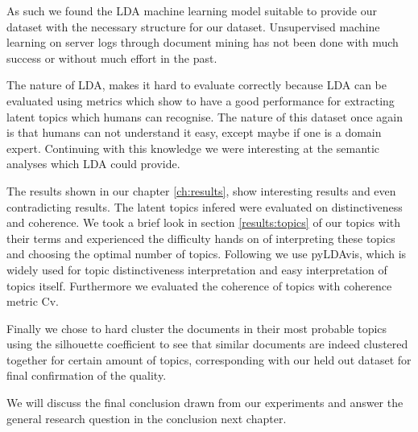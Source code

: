 As such we found the LDA machine learning model suitable to provide our dataset with the necessary structure for our dataset. Unsupervised machine learning on server logs through document mining has not been done with much success or without much effort in the past.

The nature of LDA, makes it hard to evaluate correctly because LDA can be evaluated using metrics which show to have a good performance for extracting latent topics which humans can recognise. The nature of this dataset once again is that humans can not understand it easy, except maybe if one is a domain expert. Continuing with this knowledge we were interesting at the semantic analyses which LDA could provide.

The results shown in our chapter \ref{ch:results}, show interesting results and even contradicting results. The latent topics infered were evaluated on distinctiveness and coherence. We took a brief look in section \ref{results:topics} of our topics with their terms and experienced the difficulty hands on of interpreting these topics and choosing the optimal number of topics. Following we use pyLDAvis, which is widely used for topic distinctiveness interpretation and easy interpretation of topics itself. Furthermore we evaluated the coherence of topics with coherence metric Cv.

Finally we chose to hard cluster the documents in their most probable topics using the silhouette coefficient to see that similar documents are indeed clustered together for certain amount of topics, corresponding with our held out dataset for final confirmation of the quality.

We will discuss the final conclusion drawn from our experiments and answer the general research question in the conclusion next chapter.

